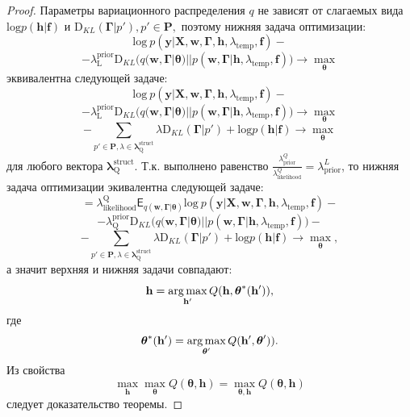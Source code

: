 \begin{proof}
Параметры вариационного распределения $q$ не зависят от слагаемых вида $\text{log}p(\mathbf{h}|\mathbf{f})$ и $\text{D}_{KL}(\boldsymbol{\Gamma} | p'), p' \in \mathbf{P},$ поэтому нижняя задача оптимизации:
\[
    \text{log}~{p(\mathbf{y} | \mathbf{X}, \mathbf{w},\boldsymbol{\Gamma}, \mathbf{h}, \lambda_\text{temp}, \mathbf{f})} -
\]
\[
    - {\lambda^\text{prior}_\text{L}\text{D}_{KL}\bigl( q(\mathbf{w}, \boldsymbol{\Gamma}|\boldsymbol{\theta}) || p(\mathbf{w}, \boldsymbol{\Gamma} |\mathbf{h}, \lambda_{\text{temp}},\mathbf{f}) \bigr)} \to \max_{\boldsymbol{\theta}}
\]
эквивалентна следующей задаче:
\[
    \text{log}~{p(\mathbf{y} | \mathbf{X}, \mathbf{w},\boldsymbol{\Gamma}, \mathbf{h}, \lambda_\text{temp}, \mathbf{f})} -
\]
\[
    - {\lambda^\text{prior}_\text{L}\text{D}_{KL}\bigl( q(\mathbf{w}, \boldsymbol{\Gamma}|\boldsymbol{\theta}) || p(\mathbf{w}, \boldsymbol{\Gamma} |\mathbf{h}, \lambda_{\text{temp}},\mathbf{f}) \bigr)} \to \max_{\boldsymbol{\theta}}
\]
\[
-{\sum_{p' \in \mathbf{P}, \lambda \in \boldsymbol{\lambda}^\text{struct}_\text{Q}} \lambda\text{D}_{KL}(\boldsymbol{\Gamma} | p')+\text{log}p(\mathbf{h}|\mathbf{f})} \to \max_{\boldsymbol{\theta}}
\] 
для любого вектора $\boldsymbol{\lambda}^\text{struct}_\text{Q}$. 
Т.к. выполнено равенство  $\frac{{\lambda_{\text{prior}}^Q}}{{\lambda_{\text{likelihood}}^Q}} = {\lambda_{\text{prior}}^L}$, то нижняя задача оптимизации экивалентна следующей задаче:
\[
= {\lambda_\text{likelihood}^\text{Q}\mathsf{E}_{{q(\mathbf{w}, \boldsymbol{\Gamma}| \boldsymbol{\theta})}} \text{log}~{p(\mathbf{y} | \mathbf{X}, \mathbf{w},\boldsymbol{\Gamma}, \mathbf{h}, \lambda_\text{temp}, \mathbf{f})}}
 -\]
\vspace{-0.3cm}
\[- {\lambda^\text{prior}_\text{Q}\text{D}_{KL}\bigl( q(\mathbf{w}, \boldsymbol{\Gamma}|\boldsymbol{\theta}) || p(\mathbf{w}, \boldsymbol{\Gamma} |\mathbf{h}, \lambda_{\text{temp}},\mathbf{f}) \bigr)}  -\]
\vspace{-0.3cm}
\[
-{\sum_{p' \in \mathbf{P}, \lambda \in \boldsymbol{\lambda}^\text{struct}_\text{Q}} \lambda\text{D}_{KL}(\boldsymbol{\Gamma} | p')+\text{log}p(\mathbf{h}|\mathbf{f})} \to \max_{\boldsymbol{\theta}},
\]  
а значит верхняя и нижняя задачи совпадают:
\[
    \mathbf{h} = \operatorname*{arg\,max}_{\mathbf{h}'} Q(\mathbf{h}, \boldsymbol{\theta}^{*}(\mathbf{h}')),
\]
где 
\[
     \boldsymbol{\theta}^{*}(\mathbf{h}') = \operatorname*{arg\,max}_{\boldsymbol{\theta}'} Q(\mathbf{h}', \boldsymbol{\theta}')).
\]
Из свойства 
\[
    \max_{\mathbf{h}}\max_{\boldsymbol{\theta}} Q(\boldsymbol{\theta}, \mathbf{h}) = \max_{\boldsymbol{\theta}, \mathbf{h}} Q(\boldsymbol{\theta}, \mathbf{h})
\]
следует доказательство теоремы.
\end{proof}



